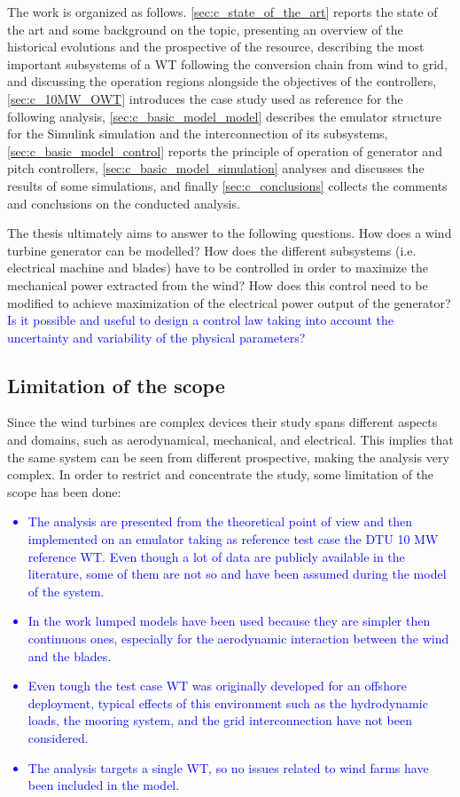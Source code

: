 The work is organized as follows. \autoref{sec:c_state_of_the_art} reports the state of the art and some background on the topic, presenting an overview of the historical evolutions and the prospective of the resource, describing the most important subsystems of a WT following the conversion chain from wind to grid, and discussing the operation regions alongside the objectives of the controllers, \autoref{sec:c_10MW_OWT} introduces the case study used as reference for the following analysis, \autoref{sec:c_basic_model_model} describes the emulator structure for the Simulink simulation and the interconnection of its subsystems, \autoref{sec:c_basic_model_control} reports the principle of operation of generator and pitch controllers, \autoref{sec:c_basic_model_simulation} analyses and discusses the results of some simulations, and finally \autoref{sec:c_conclusions} collects the comments and conclusions on the conducted analysis.

The thesis ultimately aims to answer to the following questions. How does a wind turbine generator can be modelled? How does the different subsystems (i.e. electrical machine and blades) have to be controlled in order to maximize the mechanical power extracted from the wind? How does this control need to be modified to achieve maximization of the electrical power output of the generator? \textcolor{blue}{Is it possible and useful to design a control law taking into account the uncertainty and variability of the physical parameters?}

\subsection{Limitation of the scope}\label{subsec:limitation_of_scope}
Since the wind turbines are complex devices their study spans different aspects and domains, such as aerodynamical, mechanical, and electrical. This implies that the same system can be seen from different prospective, making the analysis very complex. In order to restrict and concentrate the study, some limitation of the scope has been done:
\textcolor{blue}{
\begin{itemize}
  \item The analysis are presented from the theoretical point of view and then implemented on an emulator taking as reference test case the DTU 10 MW reference \acrfull{WT}. Even though a lot of data are publicly available in the literature, some of them are not so and have been assumed during the model of the system. 
  \item In the work lumped models have been used because they are simpler then continuous ones, especially for the aerodynamic interaction between the wind and the blades.
  \item Even tough the test case WT was originally developed for an offshore deployment, typical effects of this environment such as the hydrodynamic loads, the mooring system, and the grid interconnection have not been considered. 
  \item The analysis targets a single WT, so no issues related to wind farms have been included in the model. 
\end{itemize}
}